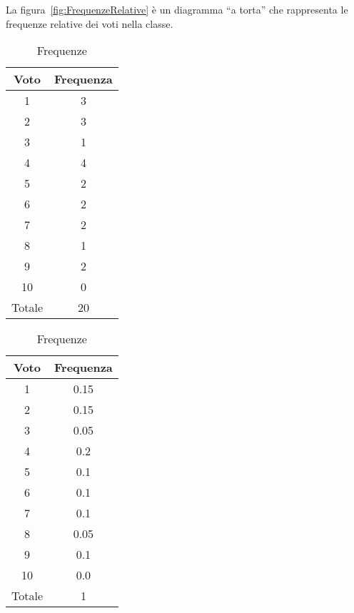 La figura~\vref*{fig:FrequenzeRelative} è un diagramma ``a torta'' che rappresenta le frequenze relative dei voti nella classe.
\begin{table}
	\begin{subtable}[b]{.5\linewidth}
		\centering\begin{tabular}{*{2}{S[table-format=1.0]}}
			\toprule
			{Voto}&{Frequenza}  \\
			& 3 \\ 
			2& 3 \\ 
			3&  1\\ 
			4&  4\\ 
			5&  2\\ 
			6&  2\\ 
			7&  2\\ 
			8&  1\\ 
			9&  2\\ 
			10&  0\\
			\midrule
			{Totale}&  20\\ 
			\bottomrule
		\end{tabular}
		\caption{Frequenze assolute}\label{tab:FrequenzeAssolute}
	\end{subtable}%
	\begin{subtable}[b]{.5\linewidth}
		\centering\begin{tabular}{S[table-format=2.0]S[table-format=1.2]}
			\toprule
			{Voto}&{Frequenza}  \\
			& 0.15 \\ 
			2& 0.15 \\ 
			3&  0.05\\ 
			4&  0.2\\ 
			5&  0.1\\ 
			6&  0.1\\ 
			7&  0.1\\ 
			8&  0.05\\ 
			9&  0.1\\ 
			10& 0.0\\
			\midrule
			{Totale}&  1\\ 
			\bottomrule
		\end{tabular}
		\caption{Frequenze relative}\label{tab:FrequenzeRelative}
	\end{subtable}
 
	\caption{Frequenze}
	\label{fig:subFrequenze}
\end{table}
